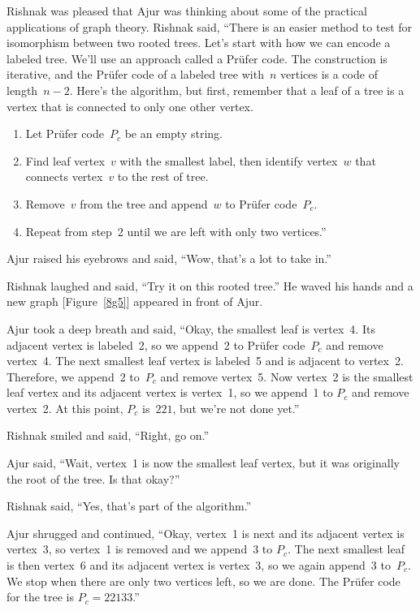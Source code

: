 Rishnak was pleased that Ajur was thinking about some of the practical applications of graph theory. Rishnak said, ``There is an easier method to test for isomorphism between two rooted trees. Let's start with how we can encode a labeled tree. We'll use an approach called a Pr\"ufer code. The construction is iterative, and the Pr\"ufer code of a labeled tree with~$n$ vertices is a code of length~$n-2$. Here's the algorithm, but first, remember that a leaf of a tree is a vertex that is connected to only one other vertex.

\begin{enumerate}
\item Let Pr{\"u}fer code~$P_c$ be an empty string.

\item Find leaf vertex~$v$ with the smallest label, then identify vertex~$w$ that connects vertex~$v$ to the rest of tree.

\item Remove~$v$ from the tree and append~$w$ to Pr{\"u}fer code~$P_c$.

\item Repeat from step~2 until we are left with only two vertices.''
\end{enumerate}

Ajur raised his eyebrows and said, ``Wow, that's a lot to take in.''

Rishnak laughed and said, ``Try it on this rooted tree.''  He waved his hands and a new graph [Figure~\ref{8g5}] appeared in front of Ajur.

Ajur took a deep breath and said, ``Okay, the smallest leaf is vertex~4. Its adjacent vertex is labeled~2, so we append~2 to Pr\"ufer code~$P_c$ and remove vertex~4. The next smallest leaf vertex is labeled~5 and is adjacent to vertex~2. Therefore, we append~2 to~$P_c$ and remove vertex~5. Now vertex~2 is the smallest leaf vertex and its adjacent vertex is vertex~1, so we append~1 to $P_c$ and remove vertex~2. At this point, $P_c$ is~$221$, but we're not done yet.''

Rishnak smiled and said, ``Right, go on.''

Ajur said, ``Wait, vertex~1 is now the smallest leaf vertex, but it was originally the root of the tree. Is that okay?''

Rishnak said, ``Yes, that's part of the algorithm.''

Ajur shrugged and continued, ``Okay, vertex~1 is next and its adjacent vertex is vertex~3, so vertex~1 is removed and we append~3 to $P_c$. The next smallest leaf is then vertex~6 and its adjacent vertex is vertex~3, so we again append~3 to~$P_c$. We stop when there are only two vertices left, so we are done. The Pr{\"u}fer code for the tree is $P_c=22133$.''

